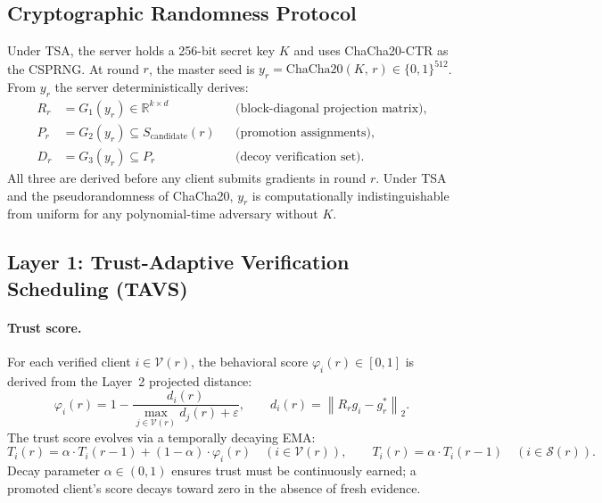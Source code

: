 \documentclass{article}
\newcommand{\R}{\mathbb{R}}
\newcommand{\norm}[1]{\left\lVert #1 \right\rVert}
\newcommand{\calV}{\mathcal{V}}      %
\newcommand{\calS}{\mathcal{S}}      %
\newcommand{\gstar}{g^{*}}           %
\newcommand{\TAVS}{\textsc{TAVS}}
\begin{document}
\subsection{Cryptographic Randomness Protocol}
\label{sec:csprng}

Under TSA, the server holds a 256-bit secret key $K$ and uses ChaCha20-CTR as
the CSPRNG.
At round $r$, the master seed is
$y_r = \mathrm{ChaCha20}(K,\, r) \in \{0,1\}^{512}$.
From $y_r$ the server deterministically derives:
\begin{align*}
  R_r &= G_1(y_r) \in \R^{k \times d}
    && \text{(block-diagonal projection matrix)}, \\
  P_r &= G_2(y_r) \subseteq S_{\mathrm{candidate}}(r)
    && \text{(promotion assignments)}, \\
  D_r &= G_3(y_r) \subseteq P_r
    && \text{(decoy verification set).}
\end{align*}
All three are derived before any client submits gradients in round $r$.
Under TSA and the pseudorandomness of ChaCha20, $y_r$ is computationally
indistinguishable from uniform for any polynomial-time adversary without $K$.

\subsection{Layer 1: Trust-Adaptive Verification Scheduling (\TAVS{})}
\label{sec:layer1}

\paragraph{Trust score.}
For each verified client $i \in \calV(r)$, the behavioral score
$\varphi_i(r) \in [0,1]$ is derived from the Layer~2 projected distance:
\[
  \varphi_i(r) = 1 - \frac{d_i(r)}{\max_{j \in \calV(r)} d_j(r) + \varepsilon},
  \qquad
  d_i(r) = \norm{R_r g_i - \gstar_r}_2.
\]
The trust score evolves via a temporally decaying EMA:
\[
  T_i(r) = \alpha \cdot T_i(r{-}1) + (1-\alpha) \cdot \varphi_i(r)
  \quad (i \in \calV(r)),
  \qquad
  T_i(r) = \alpha \cdot T_i(r{-}1)
  \quad (i \in \calS(r)).
\]
Decay parameter $\alpha \in (0,1)$ ensures trust must be continuously earned;
a promoted client's score decays toward zero in the absence of fresh evidence.
\end{document}
